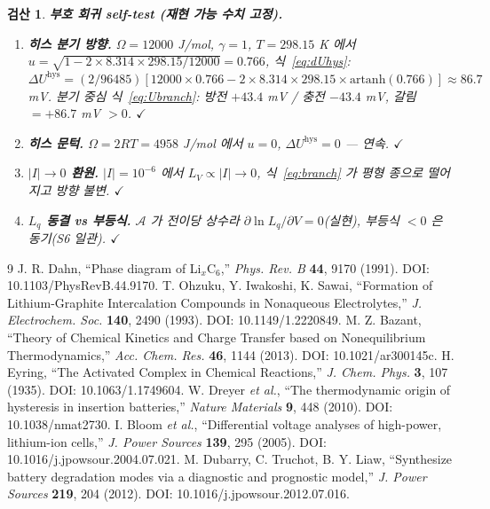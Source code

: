 \documentclass[11pt,a4paper]{article}
\newtheorem*{verifybox}{검산}
\newcommand{\hys}{\mathrm{hys}}
\begin{document}
\begin{verifybox}
\textbf{부호 회귀 self-test (재현 가능 수치 고정).}
\begin{enumerate}[label=\textbf{R\arabic*.},leftmargin=2.6em,itemsep=1pt]
\item \textbf{히스 분기 방향.} $\Omega=12000$ J/mol, $\gamma=1$, $T=298.15$ K 에서
$u=\sqrt{1-2\times8.314\times298.15/12000}=0.766$, 식~\eqref{eq:dUhys}:
$\Delta U^\hys=(2/96485)[12000\times0.766-2\times8.314\times298.15\times\mathrm{artanh}(0.766)]\approx86.7$ mV.
분기 중심 식~\eqref{eq:Ubranch}: 방전 $+43.4$ mV / 충전 $-43.4$ mV, 갈림 $=+86.7$ mV $>0$. $\checkmark$
\item \textbf{히스 문턱.} $\Omega=2RT=4958$ J/mol 에서 $u=0$, $\Delta U^\hys=0$ — 연속. $\checkmark$
\item \textbf{$|I|\!\to\!0$ 환원.} $|I|=10^{-6}$ 에서 $L_V\propto|I|\to0$, 식~\eqref{eq:branch} 가 평형 종으로 떨어지고 방향 불변. $\checkmark$
\item \textbf{$L_q$ 동결 vs 부등식.} $\mathcal A$ 가 전이당 상수라 $\partial\ln L_q/\partial V=0$(실현), 부등식 $<0$ 은 동기(S6 일관). $\checkmark$
\end{enumerate}
\end{verifybox}

\begin{thebibliography}{9}
 J. R. Dahn, ``Phase diagram of Li$_x$C$_6$,'' \emph{Phys. Rev. B} \textbf{44}, 9170 (1991). DOI: 10.1103/PhysRevB.44.9170.
 T. Ohzuku, Y. Iwakoshi, K. Sawai, ``Formation of Lithium-Graphite Intercalation Compounds in Nonaqueous Electrolytes,'' \emph{J. Electrochem. Soc.} \textbf{140}, 2490 (1993). DOI: 10.1149/1.2220849.
 M. Z. Bazant, ``Theory of Chemical Kinetics and Charge Transfer based on Nonequilibrium Thermodynamics,'' \emph{Acc. Chem. Res.} \textbf{46}, 1144 (2013). DOI: 10.1021/ar300145c.
 H. Eyring, ``The Activated Complex in Chemical Reactions,'' \emph{J. Chem. Phys.} \textbf{3}, 107 (1935). DOI: 10.1063/1.1749604.
 W. Dreyer \emph{et al.}, ``The thermodynamic origin of hysteresis in insertion batteries,'' \emph{Nature Materials} \textbf{9}, 448 (2010). DOI: 10.1038/nmat2730.
 I. Bloom \emph{et al.}, ``Differential voltage analyses of high-power, lithium-ion cells,'' \emph{J. Power Sources} \textbf{139}, 295 (2005). DOI: 10.1016/j.jpowsour.2004.07.021.
 M. Dubarry, C. Truchot, B. Y. Liaw, ``Synthesize battery degradation modes via a diagnostic and prognostic model,'' \emph{J. Power Sources} \textbf{219}, 204 (2012). DOI: 10.1016/j.jpowsour.2012.07.016.
\end{thebibliography}
\end{document}
